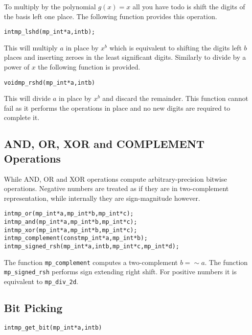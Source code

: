 \documentclass[synpaper]{book}
\begin{document}
To multiply by the polynomial $g(x) = x$ all you have todo is shift the digits of the basis left one place.  The
following function provides this operation.

\begin{alltt}
int mp_lshd (mp_int * a, int b);
\end{alltt}

This will multiply $a$ in place by $x^b$ which is equivalent to shifting the digits left $b$ places and inserting zeroes
in the least significant digits.  Similarly to divide by a power of $x$ the following function is provided.

\begin{alltt}
void mp_rshd (mp_int * a, int b)
\end{alltt}
This will divide $a$ in place by $x^b$ and discard the remainder.  This function cannot fail as it performs the operations
in place and no new digits are required to complete it.

\subsection{AND, OR, XOR and COMPLEMENT Operations}

While AND, OR and XOR operations compute arbitrary-precision bitwise operations. Negative numbers
are treated as if they are in two-complement representation, while internally they are sign-magnitude however.

   
\begin{alltt}
int mp_or  (mp_int * a, mp_int * b, mp_int * c);
int mp_and (mp_int * a, mp_int * b, mp_int * c);
int mp_xor (mp_int * a, mp_int * b, mp_int * c);
int mp_complement(const mp_int *a, mp_int *b);
int mp_signed_rsh(mp_int * a, int b, mp_int * c, mp_int * d);
\end{alltt}

The function \texttt{mp\_complement} computes a two-complement $b = \sim a$. The function \texttt{mp\_signed\_rsh} performs
sign extending right shift. For positive numbers it is equivalent to \texttt{mp\_div\_2d}.

\subsection{Bit Picking}
\begin{alltt}
int mp_get_bit(mp_int *a, int b)
\end{alltt}
\end{document}
